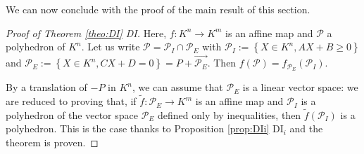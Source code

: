 \documentclass[a4paper,oneside,10pt]{article}
\newcommand{\PP}{\mathcal{P}}
\begin{document}
We can now conclude with the proof of the main result
of this section.

\begin{proof}[Proof of Theorem \ref{theo:DI} DI]
Here, $f : K^n \to K^m$ is an affine map and $\PP$ a polyhedron of $K^n.$
Let us write $\PP = \PP_I \cap \PP_E$
with $\PP_I := \left\lbrace X \in K^n,  AX+B \geq 0 \right\rbrace$
and $\PP_E := \left\lbrace X \in K^n,  CX+D=0 \right\rbrace = P + \overrightarrow{\PP_E}.$ 
Then $f(\PP) = f_{\PP_E}(\PP_I).$

By a translation of $-P$ in $K^n$, we can assume that
$\PP_E$ is a linear vector space: we are reduced to proving that, if $\tilde{f}: \PP_E \to K^m$ is an affine map and $\PP_I$ is a polyhedron of the vector space $\PP_E$ defined only by inequalities, then  $\tilde{f}(\PP_I)$ is a polyhedron.
This is the case thanks to Proposition \ref{prop:DIi} DI$_i$
and the theorem is proven.
\end{proof}
\end{document}
